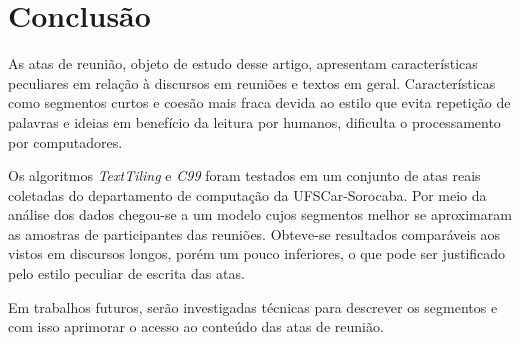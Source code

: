\section{Conclusão}
	\label{sec:conclusao}
	
	As atas de reunião, objeto de estudo desse artigo, apresentam características peculiares em relação à discursos em reuniões e textos em geral. Características como segmentos curtos e coesão mais fraca devida ao estilo que evita repetição de palavras e ideias em benefício da leitura por humanos, dificulta o processamento por computadores.

	Os algoritmos \textit{TextTiling} e \textit{C99} foram testados em um conjunto de atas reais coletadas do departamento de computação da UFSCar-Sorocaba. Por meio da análise dos dados chegou-se a um modelo cujos segmentos melhor se aproximaram as amostras de participantes das reuniões. Obteve-se resultados comparáveis aos vistos em discursos longos, porém um pouco inferiores, o que pode ser justificado pelo estilo peculiar de escrita das atas.	
	
	Em trabalhos futuros, serão investigadas técnicas para descrever os segmentos e com isso aprimorar o acesso ao conteúdo das atas de reunião.



